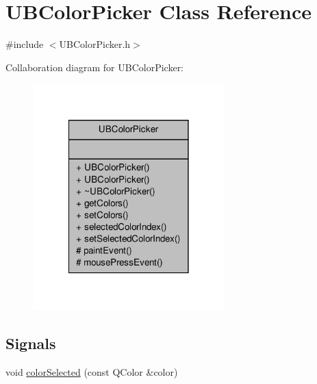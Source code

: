 \hypertarget{class_u_b_color_picker}{\section{U\-B\-Color\-Picker Class Reference}
\label{db/d45/class_u_b_color_picker}
}


{\ttfamily \#include $<$U\-B\-Color\-Picker.\-h$>$}



Collaboration diagram for U\-B\-Color\-Picker\-:
\nopagebreak
\begin{figure}[H]
\begin{center}
\leavevmode
\includegraphics[width=210pt]{d7/dbc/class_u_b_color_picker__coll__graph}
\end{center}
\end{figure}
\subsection*{Signals}
\begin{DoxyCompactItemize}
\item 
void \hyperlink{class_u_b_color_picker_afea88024868ef4f0208dc318284170ee}{color\-Selected} (const Q\-Color \&color)
\end{DoxyCompactItemize}
